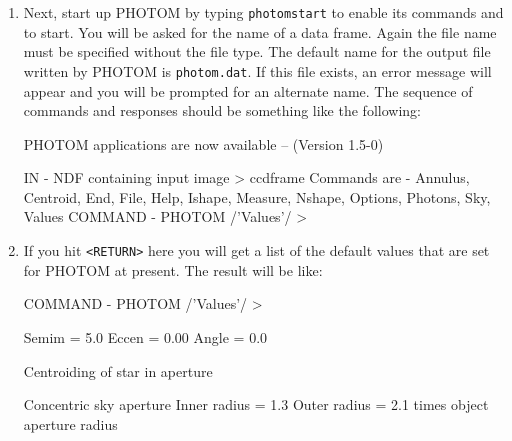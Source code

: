\documentclass[twoside,11pt,nolof]{starlink}
\begin{document}
\begin{enumerate}
    sets up a negative grey-scale colour
   table\footnote{An image displayed with the \texttt{lutneg} colour table
   mimics the appearance of a conventional astronomical photographic plate:
   stars appear as dark spots on a light background.  Various other colour
   tables are available in KAPPA.  For example, \texttt{lutgrey} sets up a
   positive grey-scale (light stars against a dark background) and
   \texttt{lutheat} sets up a pseudo-heat sequence.}.  \texttt{display} displays
   the image, which should appear as a grey-scale plot.  Note that the
   input file name is (and must be) specified without the `\texttt{.sdf}'
   file type.

  \item Next, start up PHOTOM by typing \texttt{photomstart} to enable its
   commands and  to start.  You will be
   asked for the name of a data frame.  Again the file name must be
   specified without the file type.  The default name for the output file
   written by PHOTOM is \texttt{photom.dat}.  If this file exists, an error
   message will appear and you will be prompted for an alternate name.
   The sequence of commands and responses should be something like the
   following:

{\samepage
\begin{small}
\begin{terminalv}

   PHOTOM applications are now available -- (Version 1.5-0)

IN - NDF containing input image > ccdframe
Commands are - Annulus, Centroid, End, File, Help, Ishape, Measure,
               Nshape, Options, Photons, Sky, Values
COMMAND - PHOTOM /'Values'/ >
\end{terminalv}
\end{small}
}

  \item If you hit \verb+<RETURN>+ here you will get a list of the default
   values that are set for PHOTOM at present. The result will be like:

\begin{small}
\begin{terminalv}
COMMAND - PHOTOM /'Values'/ >

 Semim           =   5.0
 Eccen           =   0.00
 Angle           =   0.0

 Centroiding of star in aperture

 Concentric sky aperture
 Inner radius    =   1.3
 Outer radius    =   2.1    times object aperture radius


\end{terminalv}
\end{small}
\end{enumerate}
\end{document}
